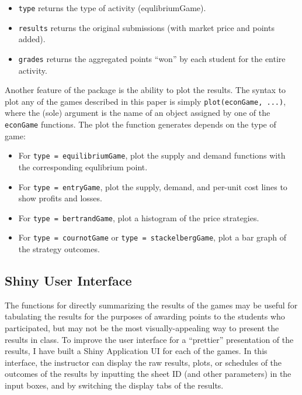 \documentclass[
]{article}
\providecommand{\tightlist}{%
  \setlength{\itemsep}{0pt}\setlength{\parskip}{0pt}}
\begin{document}
\begin{itemize}
\begin{itemize}
    \begin{itemize}
    \tightlist
    \item
      \texttt{type} returns the type of activity (equlibriumGame).
    \item
      \texttt{results} returns the original submissions (with market
      price and points added).
    \item
      \texttt{grades} returns the aggregated points ``won'' by each
      student for the entire activity.
    \end{itemize}
  \end{itemize}
\end{itemize}

Another feature of the package is the ability to plot the results. The
syntax to plot any of the games described in this paper is simply
\texttt{plot(econGame,\ ...)}, where the (sole) argument is the name of
an object assigned by one of the \texttt{econGame} functions. The plot
the function generates depends on the type of game:

\begin{itemize}
\tightlist
\item
  For
  \texttt{type\ =\ \textquotesingle{}equilibriumGame\textquotesingle{}},
  plot the supply and demand functions with the corresponding equlibrium
  point.
\item
  For \texttt{type\ =\ \textquotesingle{}entryGame\textquotesingle{}},
  plot the supply, demand, and per-unit cost lines to show profits and
  losses.
\item
  For
  \texttt{type\ =\ \textquotesingle{}bertrandGame\textquotesingle{}},
  plot a histogram of the price strategies.
\item
  For \texttt{type\ =\ \textquotesingle{}cournotGame\textquotesingle{}}
  or
  \texttt{type\ =\ \textquotesingle{}stackelbergGame\textquotesingle{}},
  plot a bar graph of the strategy outcomes.
\end{itemize}

\hypertarget{shiny-user-interface}{%
\subsection{Shiny User Interface}\label{shiny-user-interface}}

The functions for directly summarizing the results of the games may be
useful for tabulating the results for the purposes of awarding points to
the students who participated, but may not be the most
visually-appealing way to present the results in class. To improve the
user interface for a ``prettier'' presentation of the results, I have
built a Shiny Application UI for each of the games. In this interface,
the instructor can display the raw results, plots, or schedules of the
outcomes of the results by inputting the sheet ID (and other parameters)
in the input boxes, and by switching the display tabs of the results.
\end{document}
